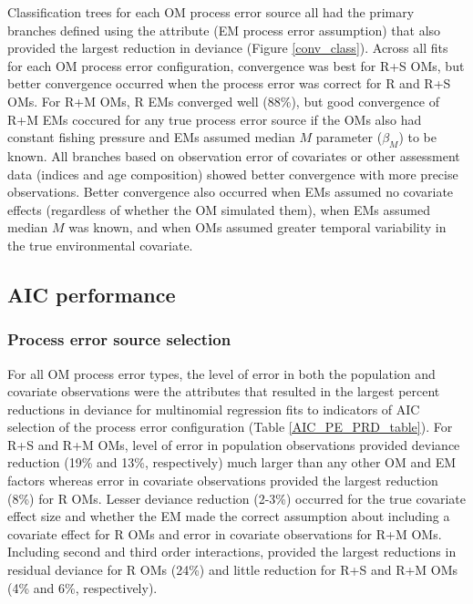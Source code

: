 \documentclass[
  12pt,
]{article}
\begin{document}
Classification trees for each OM process error source all had the primary branches defined using the attribute (EM process error assumption) that also provided the largest reduction in deviance (Figure \ref{conv_class}). Across all fits for each OM process error configuration, convergence was best for R+S OMs, but better convergence occurred when the process error was correct for R and R+S OMs. For R+M OMs, R EMs converged well (88\%), but good convergence of R+M EMs coccured for any true process error source if the OMs also had constant fishing pressure and EMs assumed median \(M\) parameter (\(\beta_M\)) to be known. All branches based on observation error of covariates or other assessment data (indices and age composition) showed better convergence with more precise observations. Better convergence also occurred when EMs assumed no covariate effects (regardless of whether the OM simulated them), when EMs assumed median \(M\) was known, and when OMs assumed greater temporal variability in the true environmental covariate.

\subsection*{AIC performance}\label{aic-performance}

\subsubsection*{Process error source selection}\label{process-error-source-selection}

For all OM process error types, the level of error in both the population and covariate observations were the attributes that resulted in the largest percent reductions in deviance for multinomial regression fits to indicators of AIC selection of the process error configuration (Table \ref{AIC_PE_PRD_table}). For R+S and R+M OMs, level of error in population observations provided deviance reduction (19\% and 13\%, respectively) much larger than any other OM and EM factors whereas error in covariate observations provided the largest reduction (8\%) for R OMs. Lesser deviance reduction (2-3\%) occurred for the true covariate effect size and whether the EM made the correct assumption about including a covariate effect for R OMs and error in covariate observations for R+M OMs. Including second and third order interactions, provided the largest reductions in residual deviance for R OMs (24\%) and little reduction for R+S and R+M OMs (4\% and 6\%, respectively).
\end{document}
